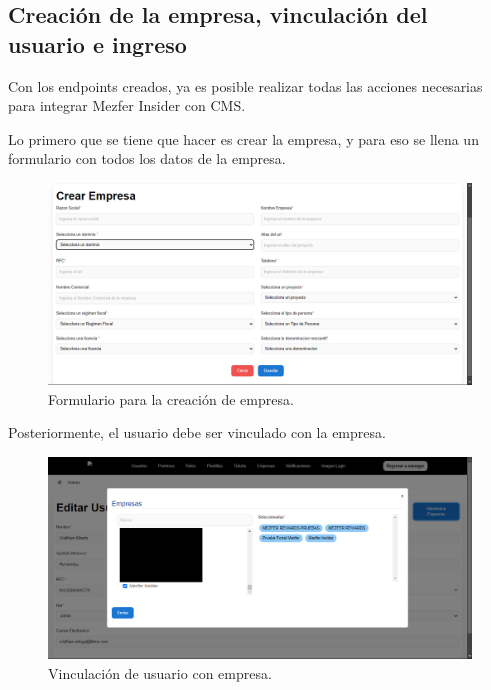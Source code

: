 \subsection{Creación de la empresa, vinculación del usuario e ingreso}
Con los endpoints creados, ya es posible realizar todas las acciones necesarias para integrar Mezfer Insider con CMS.

Lo primero que se tiene que hacer es crear la empresa, y para eso se llena un formulario con todos los datos de la empresa.
    \begin{figure}[H]
        \begin{center}
            \includegraphics[scale=0.4]{img/actividades/integracion/formulario-empresa.png}
            \caption{Formulario para la creación de empresa.}
            \label{fig:formulario-empresa}
        \end{center}
    \end{figure}
Posteriormente, el usuario debe ser vinculado con la empresa.
    \begin{figure}[H]
        \begin{center}
            \includegraphics[scale=0.4]{img/actividades/integracion/vincular-usuario.png}
            \caption{Vinculación de usuario con empresa.}
            \label{fig:vincular-usuario}
        \end{center}
    \end{figure}
